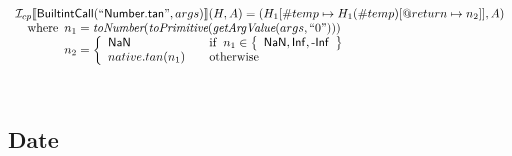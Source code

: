 \[\begin{array}{l}
\I _{cp}\lbr \SF{BuiltintCall}(``\SF{Number.tan}",args)\rbr(H,A)
  = (H_1[\#temp \mapsto H_1(\#temp)[@return \mapsto n_2]], A)\\
\quad\wherec{
  n_1 = \hf{toNumber}(\hf{toPrimitive}(\hf{getArgValue}(args, ``0")))\\
  n_2 = \left\{
    \begin{array}{l@{\quad\quad}l}
      \SF{NaN} & \ifc{n_1 \in \set{\SF{NaN}, \SF{Inf}, \SF{-Inf}}}\\
      native.tan(n_1) & \owc 
    \end{array}
  \right.
  }\\
\\\\

\end{array}
\]
\subsection{Date}
